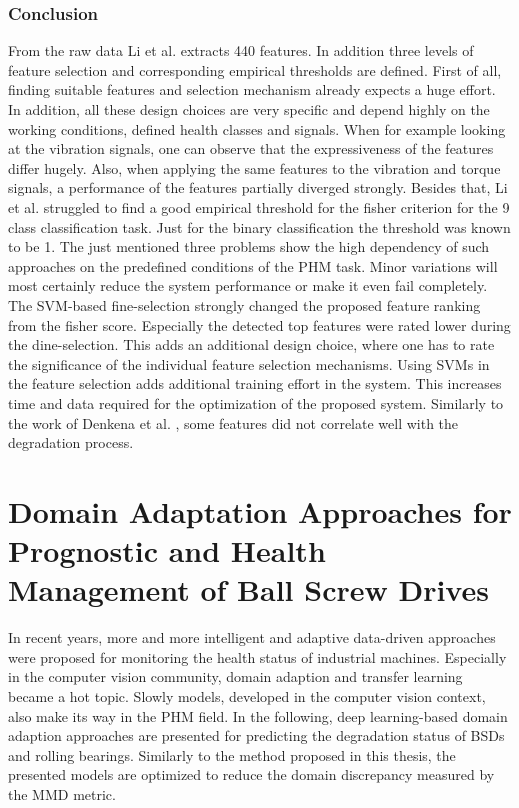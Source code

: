 \subsubsection{Conclusion}
From the raw data Li et al. extracts 440 features. In addition three levels of feature selection and corresponding empirical thresholds are defined. First of all, finding suitable features and selection mechanism already expects a huge effort. In addition, all these design choices are very specific and depend highly on the working conditions, defined health classes and signals. When for example looking at the vibration signals, one can observe that the expressiveness of the features differ hugely. Also, when applying the same features to the vibration and torque signals, a performance of the features partially diverged strongly. Besides that, Li et al. struggled to find a good empirical threshold for the fisher criterion for the 9 class classification task. Just for the binary classification the threshold was known to be 1. The just mentioned three problems show the high dependency of such approaches on the predefined conditions of the PHM task. Minor variations will most certainly reduce the system performance or make it even fail completely. The SVM-based fine-selection strongly changed the proposed feature ranking from the fisher score. Especially the detected top features were rated lower during the dine-selection. This adds an additional design choice, where one has to rate the significance of the individual feature selection mechanisms. Using SVMs in the feature selection adds additional training effort in the  system. This increases time and data required for the optimization of the proposed system. Similarly to the work of Denkena et al. \cite{Denkena2021}, some features did not correlate well with the degradation process. 

\section{Domain Adaptation Approaches for Prognostic and Health Management of Ball Screw Drives}
In recent years, more and more intelligent and adaptive data-driven approaches were proposed for monitoring the health status of industrial machines. Especially in the computer vision community, domain adaption and transfer learning became a hot topic. Slowly models, developed in the computer vision context, also make its way in the PHM field. In the following, deep learning-based domain adaption approaches are presented for predicting the degradation status of BSDs and rolling bearings. Similarly to the method proposed in this thesis, the presented models are optimized to reduce the domain discrepancy measured by the MMD metric.


